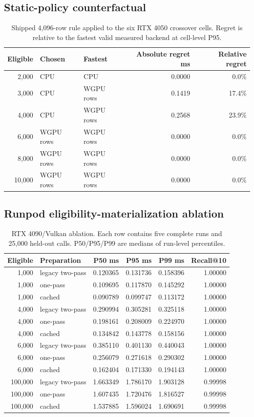 \subsection{Static-policy counterfactual}
\begin{table}[H]
\centering\scriptsize
\caption{Shipped 4,096-row rule applied to the six RTX 4050 crossover cells. Regret is relative to the fastest valid measured backend at cell-level P95.}
\begin{tabular}{rllrr}
\toprule
Eligible & Chosen & Fastest & Absolute regret ms & Relative regret \\
\midrule
2,000 & CPU & CPU & 0.0000 & 0.0\% \\
3,000 & CPU & WGPU rows & 0.1419 & 17.4\% \\
4,000 & CPU & WGPU rows & 0.2568 & 23.9\% \\
6,000 & WGPU rows & WGPU rows & 0.0000 & 0.0\% \\
8,000 & WGPU rows & WGPU rows & 0.0000 & 0.0\% \\
10,000 & WGPU rows & WGPU rows & 0.0000 & 0.0\% \\
\bottomrule
\end{tabular}
\end{table}

\subsection{Runpod eligibility-materialization ablation}
\begin{table}[H]
\centering\scriptsize
\caption{RTX 4090/Vulkan ablation. Each row contains five complete runs and 25,000 held-out calls. P50/P95/P99 are medians of run-level percentiles.}
\begin{tabular}{rlrrrr}
\toprule
Eligible & Preparation & P50 ms & P95 ms & P99 ms & Recall@10 \\
\midrule
1,000 & legacy two-pass & 0.120365 & 0.131736 & 0.158396 & 1.00000 \\
1,000 & one-pass & 0.109695 & 0.117870 & 0.145292 & 1.00000 \\
1,000 & cached & 0.090789 & 0.099747 & 0.113172 & 1.00000 \\
4,000 & legacy two-pass & 0.290994 & 0.305281 & 0.325118 & 1.00000 \\
4,000 & one-pass & 0.198161 & 0.208009 & 0.224970 & 1.00000 \\
4,000 & cached & 0.134842 & 0.143778 & 0.158156 & 1.00000 \\
6,000 & legacy two-pass & 0.385110 & 0.401130 & 0.440043 & 1.00000 \\
6,000 & one-pass & 0.256079 & 0.271618 & 0.290302 & 1.00000 \\
6,000 & cached & 0.162404 & 0.171330 & 0.194143 & 1.00000 \\
100,000 & legacy two-pass & 1.663349 & 1.786170 & 1.903128 & 0.99998 \\
100,000 & one-pass & 1.607435 & 1.720476 & 1.816527 & 0.99998 \\
100,000 & cached & 1.537885 & 1.596024 & 1.690691 & 0.99998 \\
\bottomrule
\end{tabular}
\end{table}

